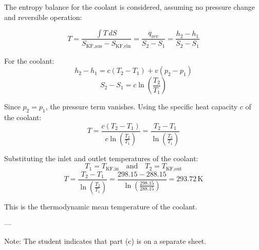 The entropy balance for the coolant is considered, assuming no pressure change and reversible operation:  

\[
T = \frac{\int T \, dS}{S_{\text{KF,aus}} - S_{\text{KF,ein}}} = \frac{q_{\text{rev}}}{S_2 - S_1} = \frac{h_2 - h_1}{S_2 - S_1}
\]  

For the coolant:  
\[
h_2 - h_1 = c (T_2 - T_1) + v (p_2 - p_1)
\]  
\[
S_2 - S_1 = c \ln \left( \frac{T_2}{T_1} \right)
\]  

Since \( p_2 = p_1 \), the pressure term vanishes. Using the specific heat capacity \( c \) of the coolant:  
\[
T = \frac{c (T_2 - T_1)}{c \ln \left( \frac{T_2}{T_1} \right)} = \frac{T_2 - T_1}{\ln \left( \frac{T_2}{T_1} \right)}
\]  

Substituting the inlet and outlet temperatures of the coolant:  
\[
T_1 = T_{\text{KF,in}} \quad \text{and} \quad T_2 = T_{\text{KF,out}}
\]  
\[
T = \frac{T_2 - T_1}{\ln \left( \frac{T_2}{T_1} \right)} = \frac{298.15 - 288.15}{\ln \left( \frac{298.15}{288.15} \right)} = 293.72 \, \text{K}
\]  

This is the thermodynamic mean temperature of the coolant.  

---

Note: The student indicates that part (c) is on a separate sheet.